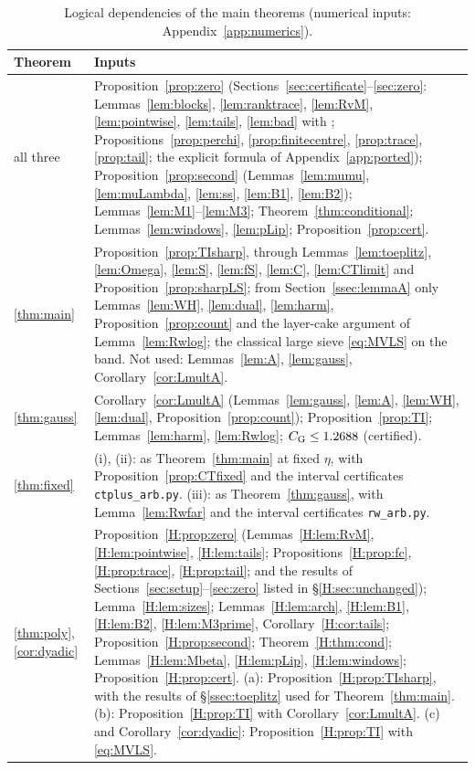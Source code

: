 \documentclass[11pt]{amsart}
\theoremstyle{definition}
\theoremstyle{remark}
\numberwithin{equation}{section}
\begin{document}
\begin{table}[ht]
\centering\footnotesize
\begin{tabular}{@{}l>{\raggedright\arraybackslash}p{12.9cm}@{}}
\toprule
Theorem & Inputs\\
\midrule
all three & Proposition~\ref{prop:zero} (Sections~\ref{sec:certificate}--\ref{sec:zero}: Lemmas~\ref{lem:blocks}, \ref{lem:ranktrace}, \ref{lem:RvM}, \ref{lem:pointwise}, \ref{lem:tails}, \ref{lem:bad} with \cite{Mon69}; Propositions~\ref{prop:perchi}, \ref{prop:finitecentre}, \ref{prop:trace}, \ref{prop:tail}; the explicit formula of Appendix~\ref{app:ported}); Proposition~\ref{prop:second} (Lemmas~\ref{lem:mumu}, \ref{lem:muLambda}, \ref{lem:ss}, \ref{lem:B1}, \ref{lem:B2}); Lemmas~\ref{lem:M1}--\ref{lem:M3}; Theorem~\ref{thm:conditional}; Lemmas~\ref{lem:windows}, \ref{lem:pLip}; Proposition~\ref{prop:cert}.\\
\ref{thm:main} & Proposition~\ref{prop:TIsharp}, through Lemmas~\ref{lem:toeplitz}, \ref{lem:Omega}, \ref{lem:S}, \ref{lem:fS}, \ref{lem:C}, \ref{lem:CTlimit} and Proposition~\ref{prop:sharpLS}; from Section~\ref{ssec:lemmaA} only Lemmas~\ref{lem:WH}, \ref{lem:dual}, \ref{lem:harm}, Proposition~\ref{prop:count} and the layer-cake argument of Lemma~\ref{lem:Rwlog}; the classical large sieve \eqref{eq:MVLS} on the band. Not used: Lemmas~\ref{lem:A}, \ref{lem:gauss}, Corollary~\ref{cor:LmultA}.\\
\ref{thm:gauss} & Corollary~\ref{cor:LmultA} (Lemmas~\ref{lem:gauss}, \ref{lem:A}, \ref{lem:WH}, \ref{lem:dual}, Proposition~\ref{prop:count}); Proposition~\ref{prop:TI}; Lemmas~\ref{lem:harm}, \ref{lem:Rwlog}; $C_{\mathrm G}\le1.2688$ (certified).\\
\ref{thm:fixed} & (i), (ii): as Theorem~\ref{thm:main} at fixed $\eta$, with Proposition~\ref{prop:CTfixed} and the interval certificates \texttt{ctplus\_arb.py}. (iii): as Theorem~\ref{thm:gauss}, with Lemma~\ref{lem:Rwfar} and the interval certificates \texttt{rw\_arb.py}.\\
\ref{thm:poly}, \ref{cor:dyadic} & Proposition~\ref{H:prop:zero} (Lemmas~\ref{H:lem:RvM}, \ref{H:lem:pointwise}, \ref{H:lem:tails}; Propositions~\ref{H:prop:fc}, \ref{H:prop:trace}, \ref{H:prop:tail}; and the results of Sections~\ref{sec:setup}--\ref{sec:zero} listed in \S\ref{H:sec:unchanged}); Lemma~\ref{H:lem:sizes}; Lemmas~\ref{H:lem:arch}, \ref{H:lem:B1}, \ref{H:lem:B2}, \ref{H:lem:M3prime}, Corollary~\ref{H:cor:tails}; Proposition~\ref{H:prop:second}; Theorem~\ref{H:thm:cond}; Lemmas~\ref{H:lem:Mbeta}, \ref{H:lem:pLip}, \ref{H:lem:windows}; Proposition~\ref{H:prop:cert}. (a): Proposition~\ref{H:prop:TIsharp}, with the results of \S\ref{ssec:toeplitz} used for Theorem~\ref{thm:main}. (b): Proposition~\ref{H:prop:TI} with Corollary~\ref{cor:LmultA}. (c) and Corollary~\ref{cor:dyadic}: Proposition~\ref{H:prop:TI} with \eqref{eq:MVLS}.\\
\bottomrule
\end{tabular}
\caption{Logical dependencies of the main theorems (numerical inputs: Appendix~\ref{app:numerics}).}\label{tab:deps}
\end{table}
\end{document}
